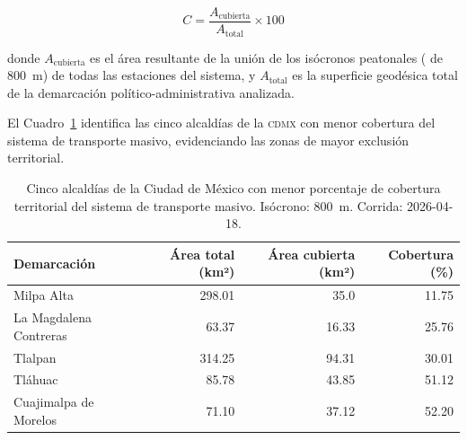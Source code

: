\begin{equation}
    C = \frac{A_{\text{cubierta}}}{A_{\text{total}}} \times 100
    \label{eq:cobertura-res}
\end{equation}

donde $A_{\text{cubierta}}$ es el área resultante de la unión de los
isócronos peatonales ( de 800~m) de todas las estaciones del sistema,
y $A_{\text{total}}$ es la superficie geodésica total de la demarcación
político-administrativa analizada.

El Cuadro~\ref{tab:peores-cdmx} identifica las cinco alcaldías de la
\textsc{cdmx} con menor cobertura del sistema de transporte masivo,
evidenciando las zonas de mayor exclusión territorial.

\begin{table}[H]
    \centering
    \caption[Alcaldías con menor cobertura de transporte masivo (CDMX)]{
    Cinco alcaldías de la Ciudad de México con menor porcentaje de cobertura
    territorial del sistema de transporte masivo. Isócrono: 800~m.
    Corrida: 2026-04-18.}
    \label{tab:peores-cdmx}
    \begin{tabular}{|l|r|r|r|}
        \hline
        \textbf{Demarcación} & \textbf{Área total (km²)} &
        \textbf{Área cubierta (km²)} & \textbf{Cobertura (\%)} \\
        \hline
        Milpa Alta              & 298.01 &  35.0    &  11.75 \\
        La Magdalena Contreras  &  63.37 &  16.33   &  25.76 \\
        Tlalpan                 & 314.25 &  94.31   &  30.01 \\
        Tláhuac                 &  85.78 &  43.85   &  51.12 \\
        Cuajimalpa de Morelos   &  71.10 &  37.12   &  52.20 \\
        \hline
    \end{tabular}
\end{table}

